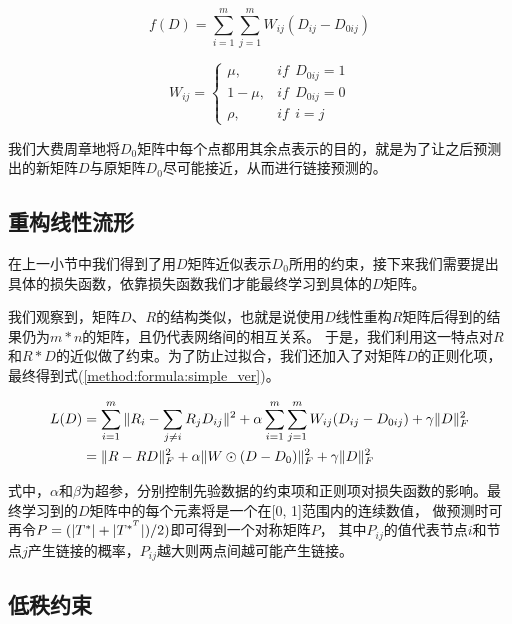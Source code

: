 \begin{equation}
    f(D)=\sum^m_{i=1}\sum^m_{j=1}W_{ij}(D_{ij}-D_{0ij}) \label{method:formula:constraint}
\end{equation}


\begin{equation}
    W_{ij}=\begin{cases}
        \mu,& if\ \ D_{0ij} = 1 \\
        1 - \mu,& if\ \ D_{0ij} = 0 \\
        \rho,& if\ \ i = j
        \end{cases}
        \label{method:formula:weight}
\end{equation}


我们大费周章地将$D_0$矩阵中每个点都用其余点表示的目的，就是为了让之后预测出的新矩阵$D$与原矩阵$D_0$尽可能接近，从而进行链接预测的。

\subsection{重构线性流形}

在上一小节中我们得到了用$D$矩阵近似表示$D_0$所用的约束，接下来我们需要提出具体的损失函数，依靠损失函数我们才能最终学习到具体的$D$矩阵。


我们观察到，矩阵$D$、$R$的结构类似，也就是说使用$D$线性重构$R$矩阵后得到的结果仍为$m*n$的矩阵，且仍代表网络间的相互关系。
于是，我们利用这一特点对$R$和$R*D$的近似做了约束。为了防止过拟合，我们还加入了对矩阵$D$的正则化项，最终得到式(\ref{method:formula:simple_ver})。


\begin{align}
L(D)&=\sum_{i=1}^m\Arrowvert{R_i-\sum_{j\neq{i}} R_jD_{ij} }\Arrowvert^2 + 
\alpha\sum_{i=1}^m\sum_{j=1}^mW_{ij}(D_{ij}-D_{0ij})+\gamma\Arrowvert{D}\Arrowvert_F^2\nonumber \\
    &= \Arrowvert{R-RD}\Arrowvert_F^2+\alpha\Arrowvert{W}\odot(D-D_0)\Arrowvert_F^2+\gamma\Arrowvert{D}\Arrowvert_F^2
    \label{method:formula:simple_ver}
\end{align}

式中，$\alpha$和$\beta$为超参，分别控制先验数据的约束项和正则项对损失函数的影响。最终学习到的$D$矩阵中的每个元素将是一个在[0, 1]范围内的连续数值，
做预测时可再令$P=(\arrowvert{T^*}\arrowvert+\arrowvert{T^{*^T}}\arrowvert)/2)$即可得到一个对称矩阵$P$，
其中$P_{ij}$的值代表节点$i$和节点$j$产生链接的概率，$P_{ij}$越大则两点间越可能产生链接。


\subsection{低秩约束}

